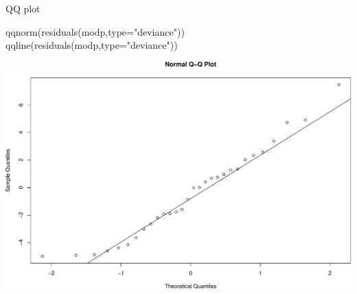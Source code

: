\documentclass[
  ignorenonframetext,
]{beamer}
\newenvironment{Shaded}{\begin{snugshade}}{\end{snugshade}}
\newcommand{\AttributeTok}[1]{\textcolor[rgb]{0.77,0.63,0.00}{#1}}
\newcommand{\FunctionTok}[1]{\textcolor[rgb]{0.00,0.00,0.00}{#1}}
\newcommand{\NormalTok}[1]{#1}
\newcommand{\StringTok}[1]{\textcolor[rgb]{0.31,0.60,0.02}{#1}}
\begin{document}
\begin{frame}[fragile]{QQ plot}
\protect\hypertarget{qq-plot}{}
\scriptsize

\begin{Shaded}
\begin{Highlighting}[]
\FunctionTok{qqnorm}\NormalTok{(}\FunctionTok{residuals}\NormalTok{(modp,}\AttributeTok{type=}\StringTok{"deviance"}\NormalTok{))}
\FunctionTok{qqline}\NormalTok{(}\FunctionTok{residuals}\NormalTok{(modp,}\AttributeTok{type=}\StringTok{"deviance"}\NormalTok{))}
\end{Highlighting}
\end{Shaded}

\includegraphics{week8_p1_files/figure-beamer/unnamed-chunk-4-1.pdf}
\end{frame}
\end{document}
